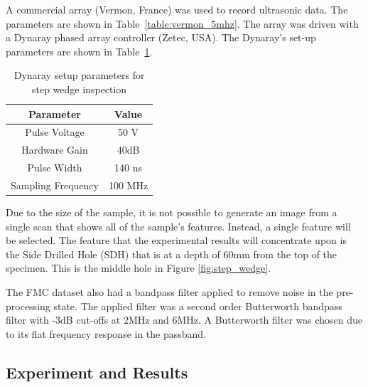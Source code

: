 A commercial array (Vermon, France) was used to record ultrasonic data. The parameters are shown in Table~\ref{table:vermon_5mhz}. The array was driven with a Dynaray phased array controller (Zetec, USA). The Dynaray's set-up parameters are shown in Table~\ref{table:dynary_setp}. 

\begin{table}[htbp!]
\begin{center}
	\begin{tabular}{| c | c |}
	\hline 
	\textbf{Parameter} & \textbf{Value} \\ \hline \hline 
	Pulse Voltage	&  50 V \\ \hline
	Hardware Gain & 40dB \\ \hline
	Pulse Width & 140 ns \\ \hline
	Sampling Frequency & 100 MHz \\ \hline
	\end{tabular}
	\caption{Dynaray setup parameters for step wedge inspection}
	\label{table:dynary_setp}
	\end{center}
	\end{table}
	
Due to the size of the sample, it is not possible to generate an image from a single scan that shows all of the sample's features. Instead, a single feature will be selected. The feature that the experimental results will concentrate upon is the Side Drilled Hole (SDH) that is at a depth of 60mm from the top of the specimen. This is the middle hole in Figure \ref{fig:step_wedge}.

The FMC dataset also had a bandpass filter applied to remove noise in the pre-processing state. The applied filter was a second order Butterworth bandpass filter with -3dB cut-offs at 2MHz and 6MHz. A Butterworth filter was chosen due to its flat frequency response in the passband.

\subsection{Experiment and Results}\label{sec:sasaci_apodization}
